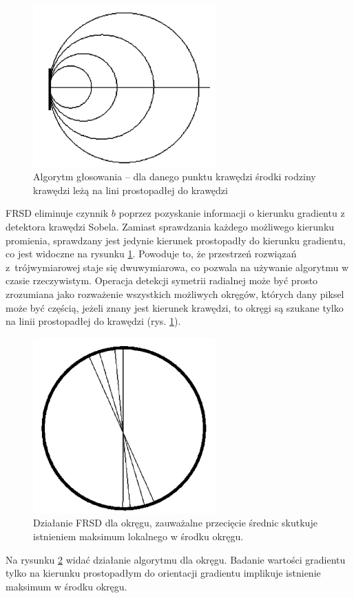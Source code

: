 \begin{figure}
  \centering
  \includegraphics[width=7cm]{img/fsrd1.png}
  \caption{Algorytm głosowania -- dla danego punktu krawędzi środki rodziny krawędzi leżą na lini prostopadłej do krawędzi\cite{T2}}
  \label{fig:frsd1}
\end{figure}

FRSD eliminuje czynnik $b$ poprzez pozyskanie informacji o kierunku gradientu z detektora krawędzi Sobela.
Zamiast sprawdzania każdego możliwego kierunku promienia, sprawdzany jest jedynie kierunek prostopadły do kierunku gradientu, co jest widoczne na rysunku \ref{fig:frsd1}. 
Powoduje to, że przestrzeń rozwiązań z~trójwymiarowej staje się dwuwymiarowa, co pozwala na używanie algorytmu w czasie rzeczywistym. 
Operacja detekcji symetrii radialnej może być prosto zrozumiana jako rozważenie wszystkich możliwych okręgów, których dany piksel może być częścią, jeżeli znany jest kierunek krawędzi, to okręgi są szukane tylko na linii prostopadłej do krawędzi (rys. \ref{fig:frsd1}). 



\begin{figure}
  \centering
  \includegraphics[width=7cm]{img/fsrd2.png}
  \caption{Działanie FRSD dla okręgu, zauważalne przecięcie średnic skutkuje istnieniem maksimum lokalnego w środku okręgu.\cite{T2}} 
  \label{fig:frsd2}
\end{figure}
Na rysunku \ref{fig:frsd2} widać działanie algorytmu dla okręgu. 
Badanie wartości gradientu tylko na kierunku prostopadłym do orientacji gradientu implikuje istnienie maksimum w środku okręgu.


